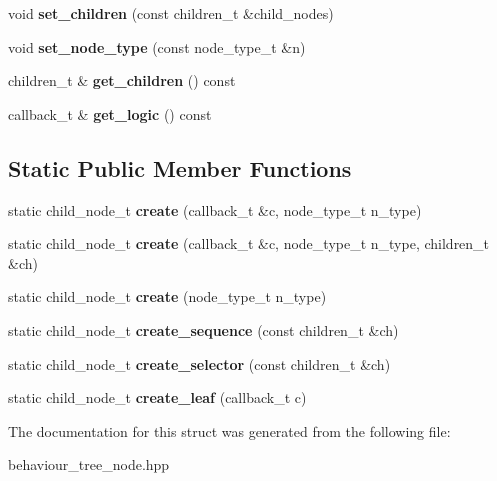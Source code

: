 \begin{DoxyCompactItemize}
void {\bfseries set\+\_\+children} (const children\+\_\+t \&child\+\_\+nodes)
\item 
\mbox{\label{structmods_1_1behaviour__tree__node_ada37b5712c40f59cbe1337f8ffd53e30}} 
void {\bfseries set\+\_\+node\+\_\+type} (const node\+\_\+type\+\_\+t \&n)
\item 
\mbox{\label{structmods_1_1behaviour__tree__node_abbaf93041975593a45c6f1d01974414d}} 
children\+\_\+t \& {\bfseries get\+\_\+children} () const
\item 
\mbox{\label{structmods_1_1behaviour__tree__node_a568a5a76aa4220bcf9b6c00a6f72561a}} 
callback\+\_\+t \& {\bfseries get\+\_\+logic} () const
\end{DoxyCompactItemize}
\subsection*{Static Public Member Functions}
\begin{DoxyCompactItemize}
\item 
\mbox{\label{structmods_1_1behaviour__tree__node_a89a977fea4bcbd9063fec397b646c89d}} 
static child\+\_\+node\+\_\+t {\bfseries create} (callback\+\_\+t \&c, node\+\_\+type\+\_\+t n\+\_\+type)
\item 
\mbox{\label{structmods_1_1behaviour__tree__node_a2b40de8dd4e5a3f88bc5483fd56cd582}} 
static child\+\_\+node\+\_\+t {\bfseries create} (callback\+\_\+t \&c, node\+\_\+type\+\_\+t n\+\_\+type, children\+\_\+t \&ch)
\item 
\mbox{\label{structmods_1_1behaviour__tree__node_a6fcc623c3a5b5652e4516328a014edce}} 
static child\+\_\+node\+\_\+t {\bfseries create} (node\+\_\+type\+\_\+t n\+\_\+type)
\item 
\mbox{\label{structmods_1_1behaviour__tree__node_ac00ab03b50be7a4e1b566b7816f88d9c}} 
static child\+\_\+node\+\_\+t {\bfseries create\+\_\+sequence} (const children\+\_\+t \&ch)
\item 
\mbox{\label{structmods_1_1behaviour__tree__node_aa392a3524753d3ff4519f8c726a3488e}} 
static child\+\_\+node\+\_\+t {\bfseries create\+\_\+selector} (const children\+\_\+t \&ch)
\item 
\mbox{\label{structmods_1_1behaviour__tree__node_ae25a417dd01919a6687b9b3a9265f6f1}} 
static child\+\_\+node\+\_\+t {\bfseries create\+\_\+leaf} (callback\+\_\+t c)
\end{DoxyCompactItemize}


The documentation for this struct was generated from the following file\+:\begin{DoxyCompactItemize}
\item 
behaviour\+\_\+tree\+\_\+node.\+hpp\end{DoxyCompactItemize}
